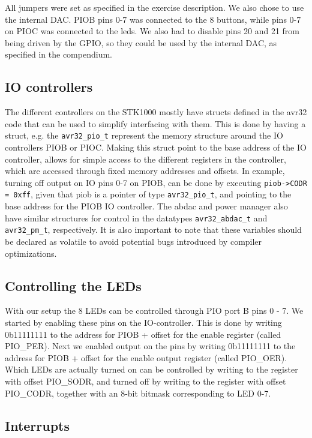 All jumpers were set as specified in the exercise description. We also chose to use the internal DAC.
PIOB pins 0-7 was connected to the 8 buttons, while pins 0-7 on PIOC was connected to the leds.
We also had to disable pins 20 and 21 from being driven by the GPIO, so they could be used by the internal DAC, as specified in the compendium.

\subsection{IO controllers}
The different controllers on the STK1000 mostly have structs defined in the avr32 code that can be used to simplify interfacing with them. This is done by having a struct, e.g. the \texttt{avr32\_pio\_t} represent the memory structure around the IO controllers PIOB or PIOC. 
Making this struct point to the base address of the IO controller, allows for simple access to the different registers in the controller, which are accessed through fixed memory addresses and offsets. 
In example, turning off output on IO pins 0-7 on PIOB, can be done by executing \texttt{piob->CODR = 0xff}, given that piob is a pointer of type \texttt{avr32\_pio\_t}, and pointing to the base address for the PIOB IO controller.
The abdac and power manager also have similar structures for control in the datatypes \texttt{avr32\_abdac\_t} and \texttt{avr32\_pm\_t}, respectively. 
It is also important to note that these variables should be declared as volatile to avoid potential bugs introduced by compiler optimizations.

\subsection{Controlling the LEDs}

With our setup the 8 LEDs can be controlled through PIO port B pins 0 - 7. We started by enabling these pins on the IO-controller. This is done by writing 0b11111111 to the address for PIOB + offset for the enable register (called PIO\_PER). Next we enabled output on the pins by writing 0b11111111 to the address for PIOB + offset for the enable output register (called PIO\_OER). Which LEDs are actually turned on can be controlled by writing to the register with offset PIO\_SODR, and turned off by writing to the register with offset PIO\_CODR, together with an 8-bit bitmask corresponding to LED 0-7.

\subsection{Interrupts}

